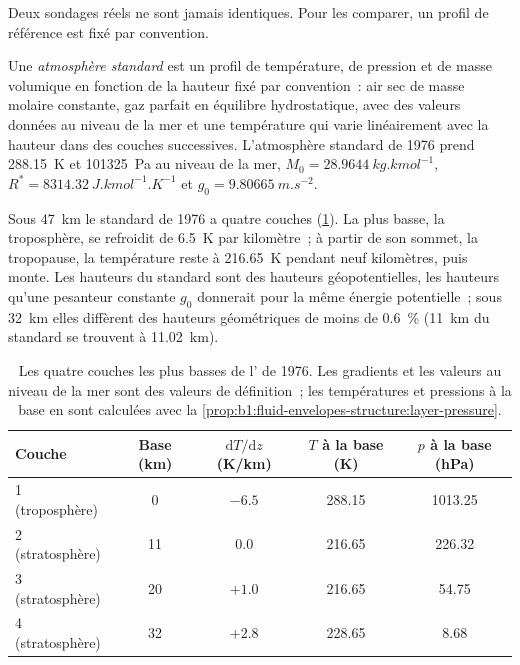 Deux sondages réels ne sont jamais identiques. Pour les comparer, un profil de référence
est fixé par convention.

\begin{definition}\label{def:b1:fluid-envelopes-structure:standard-atmosphere}
Une \emph{atmosphère standard} est un profil de
température, de pression et de masse volumique en fonction de la hauteur fixé par convention~: air sec
de masse molaire constante, gaz parfait en équilibre hydrostatique, avec des valeurs données au
niveau de la mer et une température qui varie linéairement avec la hauteur dans des
couches successives. L'atmosphère standard de 1976 prend \qty{288.15}{K} et
\qty{101325}{Pa} au niveau de la mer, $M_0 = \qty{28.9644}{kg.kmol^{-1}}$,
$R^* = \qty{8314.32}{J.kmol^{-1}.K^{-1}}$ et $g_0 = \qty{9.80665}{m.s^{-2}}$.
\end{definition}

Sous \qty{47}{km} le standard de 1976 a quatre couches
(\cref{tab:b1:fluid-envelopes-structure:layers}). La plus basse, la troposphère,
se refroidit de \qty{6.5}{K} par kilomètre~; à partir de son sommet, la tropopause, la
température reste à \qty{216.65}{K} pendant neuf kilomètres, puis monte. Les
hauteurs du standard sont des hauteurs géopotentielles, les hauteurs qu'une
pesanteur constante $g_0$ donnerait pour la même énergie potentielle~; sous \qty{32}{km} elles
diffèrent des hauteurs géométriques de moins de \qty{0.6}{\percent}
(\qty{11}{km} du standard se trouvent à \qty{11.02}{km}).

\begin{table}[ht]
\centering
\small
\renewcommand{\arraystretch}{1.2}
\begin{tabular}{|l|c|c|c|c|}
\hline
Couche & Base (km) & $\mathrm dT/\mathrm dz$ (K/km) & $T$ à la base (K) & $p$ à la base (hPa) \\
\hline
1 (troposphère) & 0 & $-6.5$ & 288.15 & 1013.25 \\
2 (stratosphère) & 11 & 0.0 & 216.65 & 226.32 \\
3 (stratosphère) & 20 & $+1.0$ & 216.65 & 54.75 \\
4 (stratosphère) & 32 & $+2.8$ & 228.65 & 8.68 \\
\hline
\end{tabular}
\caption{Les quatre couches les plus basses de l' de 1976. Les gradients
et les valeurs au niveau de la mer sont des valeurs de définition~; les températures et pressions à
la base en sont calculées avec la \cref{prop:b1:fluid-envelopes-structure:layer-pressure}.}
\label{tab:b1:fluid-envelopes-structure:layers}
\end{table}

